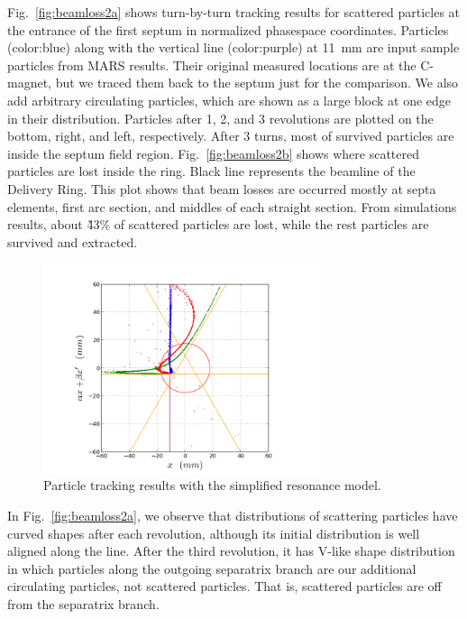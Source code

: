 \documentclass[aps,prstab,onecolumn,preprint]{revtex4-1}
\begin{document}
Fig.~\ref{fig:beamloss2a} shows turn-by-turn tracking results for scattered particles at the entrance of the first septum in normalized phasespace coordinates. Particles (color:blue) along with the vertical line (color:purple) at 11~mm are input sample particles from MARS results. Their original measured locations are at the C-magnet, but we traced them back to the septum just for the comparison. We also add arbitrary circulating particles, which are shown as a large block at one edge in their distribution. Particles after 1, 2, and 3 revolutions are plotted on the bottom, right, and left, respectively. After 3 turns, most of survived particles are inside the septum field region. Fig.~\ref{fig:beamloss2b} shows where scattered particles are lost inside the ring. Black line represents the beamline of the Delivery Ring. This plot shows that beam losses are occurred mostly at septa elements, first arc section, and middles of each straight section. From simulations results, about \~43\% of scattered particles are lost, while the rest particles are survived and extracted. 

\begin{figure}[!tbp]
  \includegraphics[width=3.2in]{img/fig_beamloss3}
  \caption{\label{fig:beamloss3} Particle tracking results with the simplified resonance model.}
\end{figure}

In Fig.~\ref{fig:beamloss2a}, we observe that distributions of scattering particles have curved shapes after each revolution, although its initial distribution is well aligned along the line. After the third revolution, it has V-like shape distribution in which particles along the outgoing separatrix branch are our additional circulating particles, not scattered particles. That is, scattered particles are off from the separatrix branch. 
\end{document}
